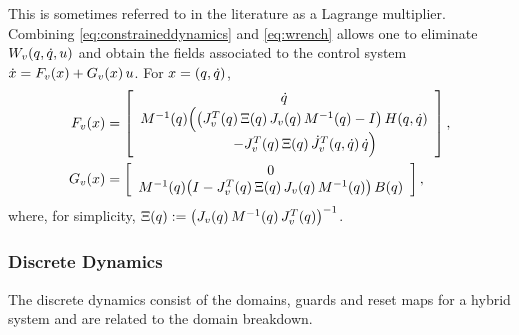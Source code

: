 %
This is sometimes referred to in the literature as a Lagrange multiplier.
%
Combining \eqref{eq:constraineddynamics} and \eqref{eq:wrench} allows one to eliminate $W_{v}(q, \dot{q}, u)$ and obtain the fields associated to the control system ${\dot {x}} = F_{v}(x) + G_{v}(x) \, u$. For $x = (q, \dot{q})$,
%
\begin{align}
  \nonumber
  F_{v}(x) &= \left[\begin{array}{c}
    \dot{q}\\
    M^{-1}(q)\Big( \big(J_{v}^{T}(q) \, \Xi(q) \, J_{v}(q) \, M^{-1}(q)
    - I \big) \, H(q, \dot{q}) \\
    \hspace{3em}- J_{v}^{T}(q) \, \Xi(q) \, {\dot J}_{v}^{T}(q, \dot{q}) \, \dot{q} \Big)
    \end{array}\right],\\
  \label{eq:controlsystem}
  G_{v}(x) &= \left[\begin{array}{c}
    0\\
    M^{-1}(q) \big(I - J_{v}^{T}(q) \, \Xi(q) \, J_{v}(q) \, M^{-1}(q)
    \big) \, B(q)
    \end{array}\right],
\end{align}
%
where, for simplicity, $\Xi(q) := \big( J_{v}(q) \, M^{-1}(q) \, J_{v}^{T}(q) \big)^{-1}$.


\subsubsection{Discrete Dynamics} \label{sec:discrete-dynamics}

The discrete dynamics consist of the domains, guards and reset maps for a hybrid
system and are related to the domain breakdown.

